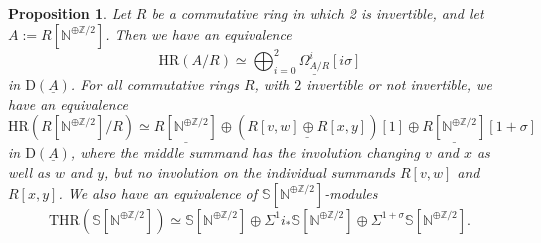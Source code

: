 \documentclass[10pt]{amsart}
\newtheorem{prop}[thm]{Proposition}
\theoremstyle{definition}
\numberwithin{equation}{section}
\newcommand{\N}{\mathbb{N}}
\newcommand{\Sphere}{\mathbb{S}}
\newcommand{\Z}{\mathbb{Z}}
\newcommand{\rD}{\mathrm{D}}
\newcommand{\ul}{\underline}
\newcommand{\HR}{\mathrm{HR}}
\newcommand{\THR}{\mathrm{THR}}
\begin{document}
\begin{prop}\label{thra2}
Let $R$ be a commutative ring in which 2 is invertible, and let $A:=R[\N^{\oplus\Z/2}]$. Then we have an equivalence
\[
\HR(A/R)
\simeq  \bigoplus _{i=0}^2 \ul{\Omega_{A/R}^i}[i \sigma]
\]
in $\rD(\ul{A})$.
For all commutative rings $R$,
with $2$ invertible or not invertible,
we have an equivalence
\[
\HR(R[\N^{\oplus \Z/2}]/R)
\simeq  \ul{R[\N^{\oplus \Z/2}]} \oplus  (\ul{R[v,w] \oplus R[x,y]})[1] \oplus \ul{R[\N^{\oplus \Z/2}]}[1 + \sigma]
\]
in $\rD(\ul{A})$,
where the middle summand has the involution changing $v$ and $x$ as well as $w$ and $y$, but no involution on the individual summands $R[v,w]$ and $R[x,y]$.
We also have an equivalence of $\Sphere[\N^{\oplus \Z/2}]$-modules
\[
\THR(\Sphere[\N^{\oplus \Z/2}])
\simeq
\Sphere[\N^{\oplus \Z/2}] \oplus \Sigma^1 i_*\Sphere[\N^{\oplus \Z/2}]
\oplus
\Sigma^{1+\sigma} \Sphere[\N^{\oplus \Z/2}].
\]
\end{prop}
\end{document}
